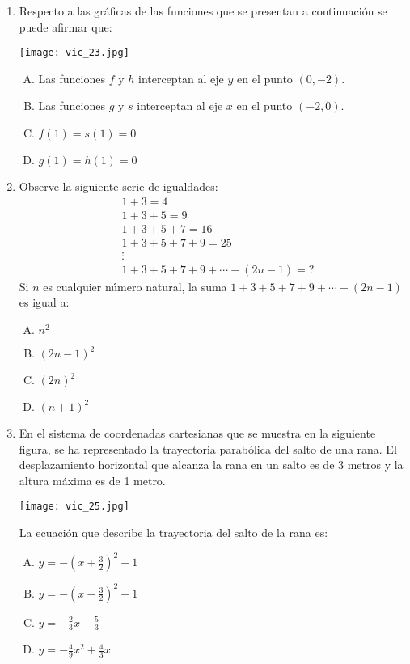\begin{enumerate}
\newpage
\item  Respecto a las gráficas de las funciones que se presentan a continuación se puede afirmar que: \label{vic-23}

\texttt{[image: vic\_23.jpg]} 

\begin{enumerate}[(A)]
\item Las funciones $f$ y $h$ interceptan al eje $y$ en el punto $(0, -2)$.
\item  Las funciones $g$ y $s$ interceptan al eje $x$ en el punto $(-2, 0)$.
\item  $f(1) = s(1) = 0$
\item $g(1) = h(1) = 0$ 
\end{enumerate}
\newpage
\item Observe la siguiente serie de igualdades: \label{vic-24}
\begin{align*}
&1+3=4\\
&1+3+5=9\\
&1+3+5+7=16\\
&1+3+5+7+9=25\\
&\vdots\\
&1+3+5+7+9+\cdots +(2n-1)=?
\end{align*}
Si $n$ es cualquier número natural, la suma $1+3+5+7+9+\cdots +(2n-1)$
es igual a: 
\begin{enumerate}[(A)]
\item $n^2$
\item $(2n-1)^2$
\item $(2n)^2$
\item $(n+1)^2$
\end{enumerate}


\newpage
\item En el sistema de coordenadas cartesianas que se muestra en la siguiente figura, se ha representado la trayectoria parabólica del salto de una rana. El desplazamiento horizontal que alcanza la rana en un salto es de 3 metros y la altura máxima es de 1 metro. \label{vic-25}

\texttt{[image: vic\_25.jpg]} 

La ecuación que describe la trayectoria  del salto de la rana es:

\begin{enumerate}[(A)]
\item $y=-\left (x+\frac{3}{2}\right )^2+1$
\item $y=-\left (x-\frac{3}{2}\right )^2+1$
\item $y=-\frac{2}{3}x-\frac{5}{3}$
\item $y=-\frac{4}{9}x^2+\frac{4}{3}x$
\end{enumerate}

\end{enumerate}
